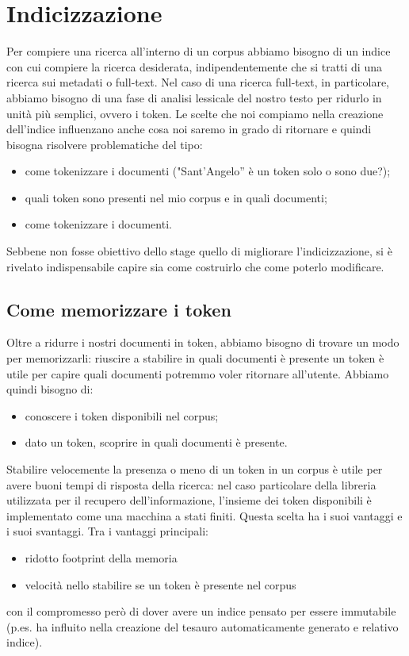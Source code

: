 \section{Indicizzazione}
Per compiere una ricerca all’interno di un corpus abbiamo bisogno di un indice con cui compiere la ricerca desiderata, indipendentemente che si tratti di una ricerca sui metadati o full-text. Nel caso di una ricerca full-text, in particolare, abbiamo bisogno di una fase di analisi lessicale del nostro testo per ridurlo in unità più semplici, ovvero i \gls{token}. Le scelte che noi compiamo nella creazione dell'indice influenzano anche cosa noi saremo in grado di ritornare e quindi bisogna risolvere problematiche del tipo:

\begin{itemize}
    \item come tokenizzare i documenti ("Sant’Angelo” è un token solo o sono due?);
    \item quali token sono presenti nel mio corpus e in quali documenti;
    \item come tokenizzare i documenti.
\end{itemize}


Sebbene non fosse obiettivo dello stage quello di migliorare l’indicizzazione, si è rivelato indispensabile capire sia come costruirlo che come poterlo modificare.

\subsection{Come memorizzare i token}
Oltre a ridurre i nostri documenti in token, abbiamo bisogno di trovare un modo per memorizzarli: riuscire a stabilire in quali documenti è presente un token è utile per capire quali documenti potremmo voler ritornare all’utente. Abbiamo quindi bisogno di:
\begin{itemize}
    \item conoscere i token disponibili nel corpus;
    \item dato un token, scoprire in quali documenti è presente.
\end{itemize}

Stabilire velocemente la presenza o meno di un token in un corpus è utile per avere buoni tempi di risposta della ricerca: nel caso particolare della libreria utilizzata per il recupero dell'informazione, l'insieme dei token disponibili è implementato come una macchina a stati finiti. Questa scelta ha i suoi vantaggi e i suoi svantaggi.
Tra i vantaggi principali:
\begin{itemize}
    \item ridotto footprint della memoria
    \item velocità nello stabilire se un token è presente nel corpus 
\end{itemize}
con il compromesso però di dover avere un indice pensato per essere immutabile (p.es. ha influito nella creazione del tesauro automaticamente generato e relativo indice).

